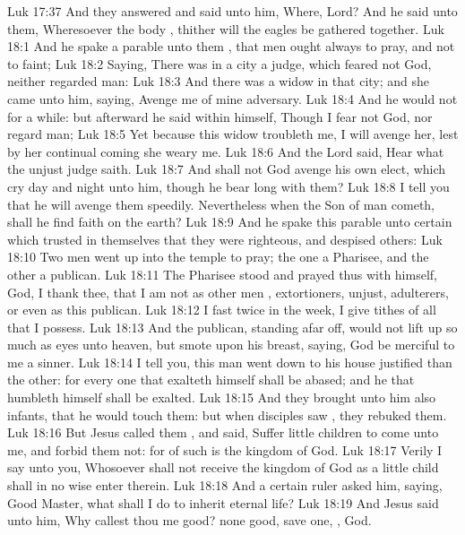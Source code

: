 \vs Luk 17:37 And they answered and said unto him, Where, Lord? And he said unto them, Wheresoever the body , thither will the eagles be gathered together.
\vs Luk 18:1 And he spake a parable unto them , that men ought always to pray, and not to faint;
\vs Luk 18:2 Saying, There was in a city a judge, which feared not God, neither regarded man:
\vs Luk 18:3 And there was a widow in that city; and she came unto him, saying, Avenge me of mine adversary.
\vs Luk 18:4 And he would not for a while: but afterward he said within himself, Though I fear not God, nor regard man;
\vs Luk 18:5 Yet because this widow troubleth me, I will avenge her, lest by her continual coming she weary me.
\vs Luk 18:6 And the Lord said, Hear what the unjust judge saith.
\vs Luk 18:7 And shall not God avenge his own elect, which cry day and night unto him, though he bear long with them?
\vs Luk 18:8 I tell you that he will avenge them speedily. Nevertheless when the Son of man cometh, shall he find faith on the earth?
\vs Luk 18:9 And he spake this parable unto certain which trusted in themselves that they were righteous, and despised others:
\vs Luk 18:10 Two men went up into the temple to pray; the one a Pharisee, and the other a publican.
\vs Luk 18:11 The Pharisee stood and prayed thus with himself, God, I thank thee, that I am not as other men , extortioners, unjust, adulterers, or even as this publican.
\vs Luk 18:12 I fast twice in the week, I give tithes of all that I possess.
\vs Luk 18:13 And the publican, standing afar off, would not lift up so much as  eyes unto heaven, but smote upon his breast, saying, God be merciful to me a sinner.
\vs Luk 18:14 I tell you, this man went down to his house justified  than the other: for every one that exalteth himself shall be abased; and he that humbleth himself shall be exalted.
\vs Luk 18:15 And they brought unto him also infants, that he would touch them: but when  disciples saw , they rebuked them.
\vs Luk 18:16 But Jesus called them , and said, Suffer little children to come unto me, and forbid them not: for of such is the kingdom of God.
\vs Luk 18:17 Verily I say unto you, Whosoever shall not receive the kingdom of God as a little child shall in no wise enter therein.
\vs Luk 18:18 And a certain ruler asked him, saying, Good Master, what shall I do to inherit eternal life?
\vs Luk 18:19 And Jesus said unto him, Why callest thou me good? none  good, save one, , God.
